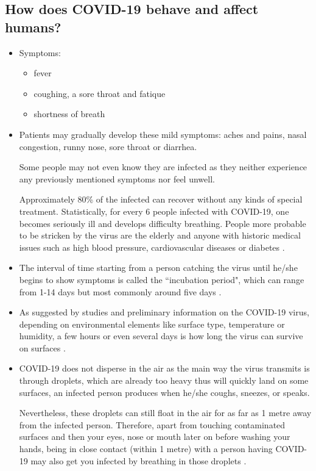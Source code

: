   \subsection{How does COVID-19 behave and affect humans?}
    \begin{itemize}
      \item Symptoms: \parencite{HealthGovAU}
        \begin{itemize}
          \item fever
          \item coughing, a sore throat and fatique
          \item shortness of breath
        \end{itemize}
      \item Patients may gradually develop these mild symptoms: aches and pains, nasal congestion, runny nose, sore throat or diarrhea.
      \par Some people may not even know they are infected as they neither experience any previously mentioned symptoms nor feel unwell.
      \par Approximately 80\% of the infected can recover without any kinds of special treatment. Statistically, for every 6 people infected with COVID-19, one becomes seriously ill and develops difficulty breathing. People more probable to be stricken by the virus are the elderly and anyone with historic medical issues such as high blood pressure, cardiovascular diseases or diabetes \parencite{Q&A_WHO}.
      \item The interval of time starting from a person catching the virus until he/she begins to show symptoms is called the ``incubation period", which can range from 1-14 days but most commonly around five days \parencite{Q&A_WHO}.
      \item As suggested by studies and preliminary information on the COVID-19 virus, depending on environmental elements like surface type, temperature or humidity, a few hours or even several days is how long the virus can survive on surfaces \parencite{Q&A_WHO}.
      \item COVID-19 does not disperse in the air as the main way the virus transmits is through droplets, which are already too heavy thus will quickly land on some surfaces, an infected person produces when he/she coughs, sneezes, or speaks.
      \par Nevertheless, these droplets can still float in the air for as far as 1 metre away from the infected person. Therefore, apart from touching contaminated surfaces and then your eyes, nose or mouth later on before washing your hands, being in close contact (within 1 metre) with a person having COVID-19 may also get you infected by breathing in those droplets \parencite{Q&A_WHO}.

\end{itemize}

